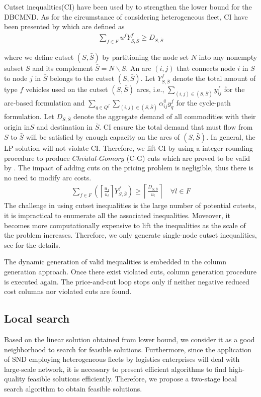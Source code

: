 \documentclass[11pt,nonblindrev,fleqn]{article}
\begin{document}
Cutset inequalities(CI) have been used by \cite{Chouman2015Cutting} to strengthen the lower bound for the DBCMND. As for the circumstance of considering heterogeneous fleet, CI have been presented by \cite{Kim1999Multimodal} which are defined as
\begin{align}
    \sum_{f\in F}u^f Y_{S,\bar{S}}^f \geq  D_{S,\bar{S}}
\end{align}

where we define cutset $(S,\bar{S})$ by partitioning the node set $N$ into any nonempty subset $S$ and its complement $\bar{S}=N\backslash S$. An arc $(i,j)$ that connects node $i$ in $S$ to node $j$ in $\bar{S}$  belongs to the cutset $(S,\bar{S})$. Let $Y_{S,\bar{S}}^f$ denote the total amount of type $f$ vehicles used on the cutset $(S,\bar{S})$ arcs, i.e., $\sum_{(i,j)\in (S,\bar{S})} y_{ij}^f$ for the arc-based formulation and $\sum_{q\in Q^f}\sum_{(i,j)\in (S,\bar{S})} \alpha_{ij}^q y_q^f $ for the cycle-path formulation. Let $D_{S,\bar{S}}$ denote the aggregate demand of all commodities with their origin in$S$ and destination in $\bar{S}$. CI ensure the total demand that must flow from $S$ to $\bar{S}$ will be satisfied by enough capacity on the arcs of $(S,\bar{S})$. In general, the LP solution will not violate CI. Therefore, we lift CI by using a integer rounding procedure to produce $Chv\acute{a}tal$-$Gomory$ (C-G) cuts which are proved to be valid by \cite{Kim1999Multimodal}. The impact of adding cuts on the pricing problem is negligible, thus there is no need to modify arc costs.
\begin{align}
  \sum_{f\in F} \left( \left \lceil \frac{u_f}{u_l} \right \rceil Y_{S,\bar{S}}^f  \right)  \geq \left\lceil \frac{D_{S,\bar{S}}}{u_l} \right\rceil  \quad   \forall l\in F
\end{align}
The challenge in using cutset inequalities is the large number of potential cutsets, it is impractical to enumerate all the associated inequalities. Moveover, it becomes more computationally expensive to lift the inequalities as the scale of the problem increases. Therefore, we only generate single-node cutset inequalities, see \cite{Chouman2016Commodity} for the details.

The dynamic generation of valid inequalities is embedded in the column generation approach. Once there exist violated cuts, column generation procedure is executed again. The price-and-cut loop stops only if neither negative reduced cost columns nor violated cuts are found.

\subsection{Local search}
Based on the linear solution obtained from lower bound, we consider it as a good neighborhood to search for feasible solutions. Furthermore, since the application of SND employing heterogeneous fleets by logistics enterprises will deal with large-scale network, it is necessary to present efficient algorithms to find high-quality feasible solutions efficiently. Therefore, we propose a two-stage local search algorithm to obtain feasible solutions.
\end{document}

